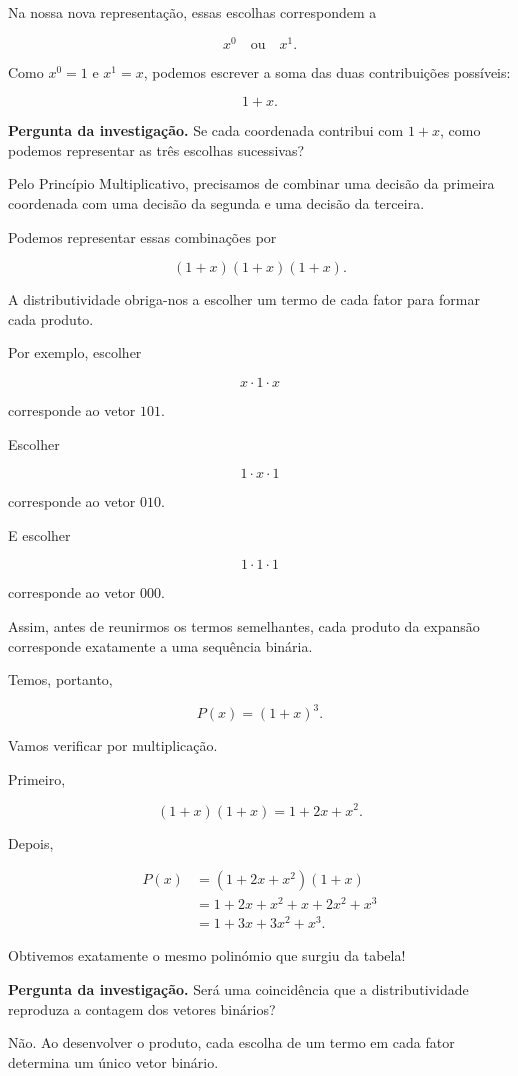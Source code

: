 \documentclass[11pt,a4paper,oneside]{book}
\newcommand{\Pergunta}[1]{\begin{perguntabox}\textbf{Pergunta da investigação.} #1\end{perguntabox}}
\begin{document}
Na nossa nova representação, essas escolhas
correspondem a

\[
x^0\quad\text{ou}\quad x^1.
\]

Como $x^0=1$ e $x^1=x$, podemos escrever
a soma das duas contribuições possíveis:

\[
1+x.
\]

\Pergunta{Se cada coordenada contribui com
$1+x$, como podemos representar as três
escolhas sucessivas?}

Pelo Princípio Multiplicativo, precisamos de
combinar uma decisão da primeira coordenada
com uma decisão da segunda e uma decisão
da terceira.

Podemos representar essas combinações por

\[
(1+x)(1+x)(1+x).
\]

A distributividade obriga-nos a escolher um
termo de cada fator para formar cada produto.

Por exemplo, escolher

\[
x\cdot1\cdot x
\]

corresponde ao vetor $101$.

Escolher

\[
1\cdot x\cdot1
\]

corresponde ao vetor $010$.

E escolher

\[
1\cdot1\cdot1
\]

corresponde ao vetor $000$.

Assim, antes de reunirmos os termos semelhantes,
cada produto da expansão corresponde exatamente
a uma sequência binária.

Temos, portanto,

\[
P(x)=(1+x)^3.
\]

Vamos verificar por multiplicação.

Primeiro,

\[
(1+x)(1+x)=1+2x+x^2.
\]

Depois,

\[
\begin{aligned}
P(x)
&=(1+2x+x^2)(1+x)\\
&=1+2x+x^2+x+2x^2+x^3\\
&=1+3x+3x^2+x^3.
\end{aligned}
\]

Obtivemos exatamente o mesmo polinómio
que surgiu da tabela!

\Pergunta{Será uma coincidência que a
distributividade reproduza a contagem
dos vetores binários?}

Não. Ao desenvolver o produto, cada escolha
de um termo em cada fator determina um
único vetor binário.
\end{document}
